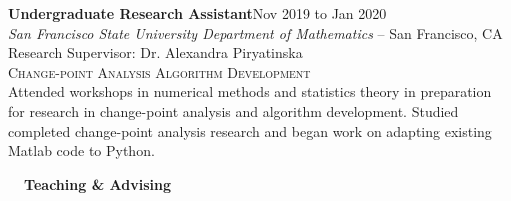 \documentclass[hidelinks, 10pt]{article}
\begin{document}
{{    \vspace{4mm}


    \begin{minipage}[ct]{0.9\linewidth}
        \textbf{Undergraduate Research Assistant}\hfill Nov 2019 to Jan 2020\\
        \emph{San Francisco State University Department of Mathematics} -- San Francisco, CA\\
        Research Supervisor: Dr. Alexandra Piryatinska\\
        {\textsc{Change-point Analysis Algorithm Development}}
        \vspace{1mm}\\
        Attended workshops in numerical methods and statistics theory in preparation for research in change-point analysis and algorithm
        development.  Studied completed change-point analysis research and began work on adapting existing Matlab code to Python.
    \end{minipage}
}

\vspace{7mm}


{\fontsize{14}{14}\selectfont \textbf{\ \ Teaching \& Advising\ \ }}\hrulefill

\vspace{5mm}

}
\end{document}
